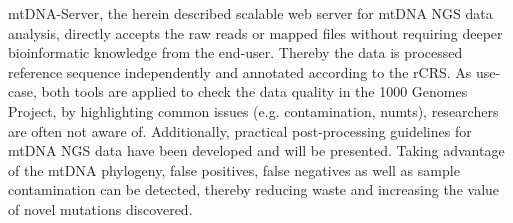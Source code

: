 mtDNA-Server, the herein described scalable web server for mtDNA NGS data analysis, directly accepts the raw reads or mapped files without requiring deeper bioinformatic knowledge from the end-user. Thereby the data is processed reference sequence independently and annotated according to the rCRS. 
As use-case, both tools are applied to check the data quality in the 1000 Genomes Project, by highlighting common issues (e.g. contamination, numts), researchers are often not aware of. Additionally, practical post-processing guidelines for mtDNA NGS data have been developed and will be presented. Taking advantage of the mtDNA phylogeny, false positives, false negatives as well as sample contamination can be detected, thereby reducing waste and increasing the value of novel mutations discovered.
